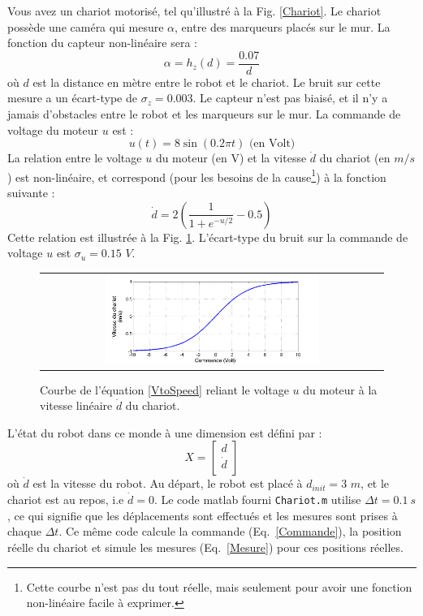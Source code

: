 \documentclass[12pt]{article}
\begin{document}
Vous avez un chariot motorisé, tel qu'illustré à la Fig. \ref{Chariot}. Le chariot possède une caméra qui mesure $\alpha$, entre des marqueurs placés sur le mur. La fonction du capteur non-linéaire sera :
\begin{equation}
\alpha = h_z(d) = \frac{0.07}{d}
\label{Mesure}
\end{equation}
où $d$ est la distance en mètre entre le robot et le chariot. Le bruit sur cette mesure a un écart-type de $\sigma_{z}=0.003$. Le capteur n'est pas biaisé, et il n'y a jamais d'obstacles entre le robot et les marqueurs sur le mur.
La commande de voltage du moteur $u$ est :
\begin{equation}
u(t) = 8\sin(0.2\pi t) \mbox{ (en Volt)}
\label{Commande}
\end{equation}
La relation entre le voltage $u$ du moteur (en V) et la vitesse $\dot{d}$ du chariot (en $m/s$) est non-linéaire, et correspond (pour les besoins de la cause\footnote{Cette courbe n'est pas du tout réelle, mais seulement pour avoir une fonction non-linéaire facile à exprimer.}) à la fonction suivante :
\begin{equation}
\dot{d} = 2(\frac{1}{1+e^{-u/2}}-0.5)
\label{VtoSpeed}
\end{equation}
Cette relation est illustrée à la Fig. \ref{CurveVolt}. L'écart-type du bruit sur la commande de voltage $u$ est $\sigma_u=0.15$ $V$.

\begin{figure}[ht]
 \begin{center}
  \begin{tabular}{c}
    \includegraphics[width=0.64\textwidth]{CurveVolt.png} 
  \end{tabular}
 \end{center}
 \vspace{-0.3in}
 \caption{Courbe de l'équation \ref{VtoSpeed} reliant le voltage $u$ du moteur à la vitesse linéaire $\dot{d}$ du chariot.}
 \label{CurveVolt}
\end{figure}
L'état du robot dans ce monde à une dimension est défini par :
\begin{equation}
X = \begin{bmatrix}
d  \\
\dot{d}   \\
\end{bmatrix}
\end{equation}
où $\dot{d}$ est la vitesse du robot. Au départ, le robot est placé à $d_{init}=3$ $m$, et le chariot est au repos, i.e $\dot{d}=0$. Le code matlab fourni \texttt{Chariot.m} utilise $\Delta t=0.1~s$, ce qui signifie que les déplacements sont effectués et les mesures sont prises à chaque $\Delta t$. Ce même code calcule la commande (Eq.~\ref{Commande}), la position réelle du chariot et simule les mesures (Eq.~\ref{Mesure}) pour ces positions réelles.
\end{document}
